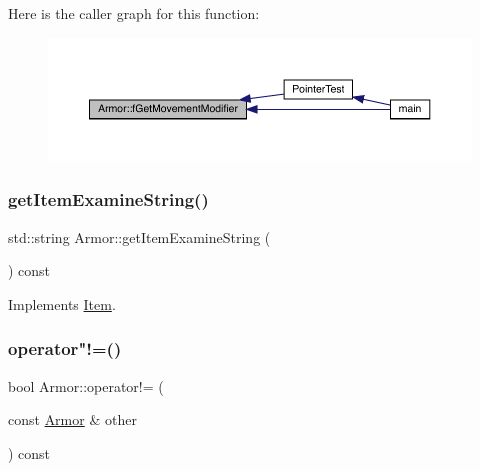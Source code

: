 Here is the caller graph for this function\+:
\nopagebreak
\begin{figure}[H]
\begin{center}
\leavevmode
\includegraphics[width=350pt]{class_armor_a788fee5745a82a7ffc587aa4938200dc_icgraph}
\end{center}
\end{figure}
\mbox{\label{class_armor_a731bb4d1fe53070f30a336db82fada2c}} 
\subsubsection{\texorpdfstring{get\+Item\+Examine\+String()}{getItemExamineString()}}
{\footnotesize\ttfamily std\+::string Armor\+::get\+Item\+Examine\+String (\begin{DoxyParamCaption}{ }\end{DoxyParamCaption}) const\hspace{0.3cm}{\ttfamily [virtual]}}



Implements \mbox{\hyperlink{class_item_a00e06647e1adeb62f2d95044476126ac}{Item}}.

\mbox{\label{class_armor_a912e1ad6bfe7509c66c2c4966cf5188c}} 
\subsubsection{\texorpdfstring{operator"!=()}{operator!=()}}
{\footnotesize\ttfamily bool Armor\+::operator!= (\begin{DoxyParamCaption}\item[{const \mbox{\hyperlink{class_armor}{Armor}} \&}]{other }\end{DoxyParamCaption}) const}

\mbox{\label{class_armor_ad706d994c7d3a3ea4d7c1728faccc0aa}} 
